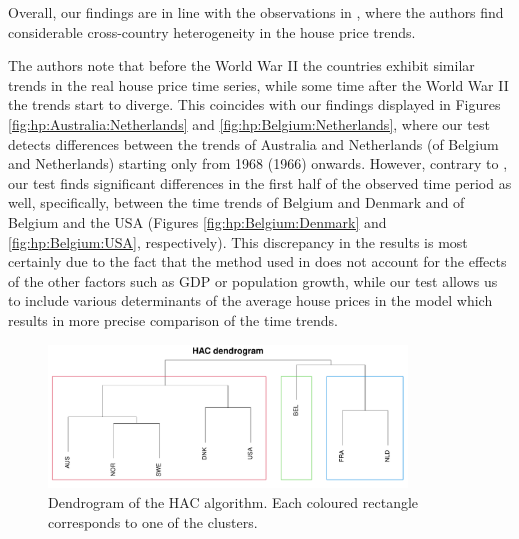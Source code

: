 \documentclass[a4paper,12pt]{article}
\makeatletter
\renewcommand{\eqref}[1]{\tagform@{\ref{#1}}}
\makeatother
\begin{document}
Overall, our findings are in line with the observations in \cite{Knoll2017}, where the authors find considerable cross-country heterogeneity in the house price trends. {\color{blue}The authors note that before the World War II the countries exhibit similar trends in the real house price time series, while some time after the World War II the trends start to diverge. This coincides with our findings displayed in Figures \ref{fig:hp:Australia:Netherlands} and \ref{fig:hp:Belgium:Netherlands}, where our test detects differences between the trends of Australia and Netherlands (of Belgium and Netherlands) starting only from 1968 (1966) onwards. However, contrary to \cite{Knoll2017}, our test finds significant differences in the first half of the observed time period as well, specifically, between the time trends of Belgium and Denmark and of Belgium and the USA (Figures \ref{fig:hp:Belgium:Denmark} and \ref{fig:hp:Belgium:USA}, respectively). This discrepancy in the results is most certainly due to the fact that the method used in \cite{Knoll2017} does not account for the effects of the other factors such as GDP or population growth, while our test allows us to include various determinants of the average house prices in the model \eqref{eq:model:app4} which results in more precise comparison of the time trends.

\begin{figure}[t!]
\begin{center}
\includegraphics[width=0.85\textwidth]{output/plots/hp/dendrogram}
\caption{Dendrogram of the HAC algorithm. Each coloured rectangle corresponds to one of the clusters.}\label{fig:hp:dend}


\end{center}
\end{figure}}
\end{document}
